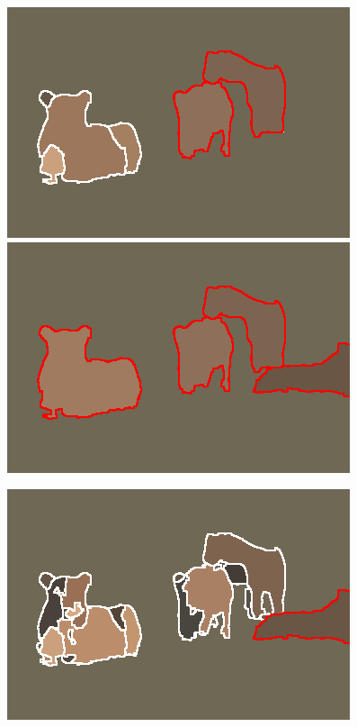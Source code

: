 \begin{figure}
\begin{center}
\begin{minipage}{0.24\linewidth}
\end{minipage}
\begin{minipage}{0.24\linewidth}
\includegraphics[width=\linewidth]{fig/aligned_lions/mcg_mid.png}\\[1mm]
\includegraphics[width=\linewidth]{fig/aligned_lions/mcg_our_good.png}
\end{minipage}
\begin{minipage}{0.24\linewidth}
\includegraphics[width=\linewidth]{fig/aligned_lions/mcg_overseg.png}\\[1mm]

\end{minipage}
\end{center}
\end{figure}
